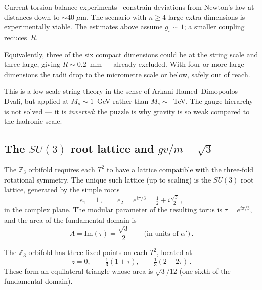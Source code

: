 \documentclass[12pt,a4paper]{article}
\begin{document}
\noindent
Current torsion-balance experiments~\cite{Adelberger2009} constrain
deviations from Newton's law at distances down to $\sim 40\;\mu$m.
The scenario with $n \geq 4$ large extra dimensions is experimentally
viable.  The estimates above assume $g_s \sim 1$;
a smaller coupling reduces~$R$.

Equivalently, three of the six compact dimensions could be at the
string scale and three large, giving
$R \sim 0.2$~mm --- already excluded.  With four or more large
dimensions the radii drop to the micrometre scale or below, safely
out of reach.

This is a low-scale string theory in the sense of
Arkani-Hamed--Dimopoulos--Dvali, but applied at $M_s \sim 1$~GeV
rather than $M_s \sim$~TeV.  The gauge hierarchy is not solved ---
it is \emph{inverted}: the puzzle is why gravity is so weak
compared to the hadronic scale.

\subsection{The $SU(3)$ root lattice and $gv/m = \sqrt{3}$}

The $\mathbb{Z}_3$ orbifold requires each $T^2$ to have a lattice
compatible with the three-fold rotational symmetry.  The unique such
lattice (up to scaling) is the $SU(3)$ root lattice, generated by
the simple roots
\begin{equation}
  e_1 = 1\,,\qquad
  e_2 = e^{i\pi/3} = \tfrac{1}{2} + i\tfrac{\sqrt{3}}{2}\,,
\end{equation}
in the complex plane.  The modular parameter of the resulting torus is
$\tau = e^{i\pi/3}$, and the area of the fundamental domain is
\begin{equation}
  A = \mathrm{Im}(\tau) = \frac{\sqrt{3}}{2}
  \qquad\text{(in units of $\alpha'$)}\,.
\end{equation}

The $\mathbb{Z}_3$ orbifold has three fixed points on each $T^2$,
located at
\begin{equation}
  z = 0,\qquad
  \tfrac{1}{3}(1 + \tau),\qquad
  \tfrac{1}{3}(2 + 2\tau)\,.
\end{equation}
These form an equilateral triangle whose area is
$\sqrt{3}/12$ (one-sixth of the fundamental domain).
\end{document}
